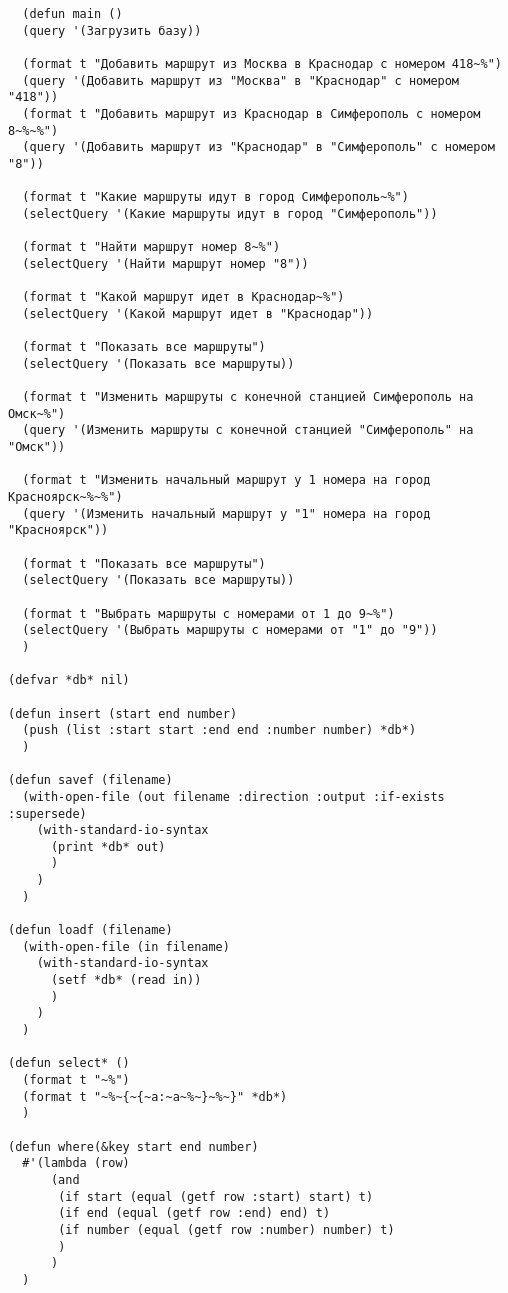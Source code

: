 \documentclass[a4paper,14pt]{extarticle}
\begin{document}
\begin{lstlisting}
  (defun main ()
  (query '(Загрузить базу))
  
  (format t "Добавить маршрут из Москва в Краснодар с номером 418~%")
  (query '(Добавить маршрут из "Москва" в "Краснодар" с номером "418"))
  (format t "Добавить маршрут из Краснодар в Симферополь с номером 8~%~%")
  (query '(Добавить маршрут из "Краснодар" в "Симферополь" с номером "8"))
  
  (format t "Какие маршруты идут в город Симферополь~%")
  (selectQuery '(Какие маршруты идут в город "Симферополь"))
  
  (format t "Найти маршрут номер 8~%")
  (selectQuery '(Найти маршрут номер "8"))
  
  (format t "Какой маршрут идет в Краснодар~%")
  (selectQuery '(Какой маршрут идет в "Краснодар"))
  
  (format t "Показать все маршруты")
  (selectQuery '(Показать все маршруты))
  
  (format t "Изменить маршруты с конечной станцией Симферополь на Омск~%")
  (query '(Изменить маршруты с конечной станцией "Симферополь" на "Омск"))
  
  (format t "Изменить начальный маршрут у 1 номера на город Красноярск~%~%")
  (query '(Изменить начальный маршрут у "1" номера на город "Красноярск"))
  
  (format t "Показать все маршруты")
  (selectQuery '(Показать все маршруты))
  
  (format t "Выбрать маршруты с номерами от 1 до 9~%")
  (selectQuery '(Выбрать маршруты с номерами от "1" до "9"))
  )

(defvar *db* nil)

(defun insert (start end number)
  (push (list :start start :end end :number number) *db*)
  )

(defun savef (filename)
  (with-open-file (out filename :direction :output :if-exists :supersede)
    (with-standard-io-syntax
      (print *db* out)
      )
    )
  )

(defun loadf (filename)
  (with-open-file (in filename)
    (with-standard-io-syntax
      (setf *db* (read in))
      )
    )
  )

(defun select* ()
  (format t "~%")
  (format t "~%~{~{~a:~a~%~}~%~}" *db*)
  )

(defun where(&key start end number)
  #'(lambda (row)
      (and 
       (if start (equal (getf row :start) start) t)
       (if end (equal (getf row :end) end) t)
       (if number (equal (getf row :number) number) t)
       )
      )
  )


\end{lstlisting}
\end{document}
